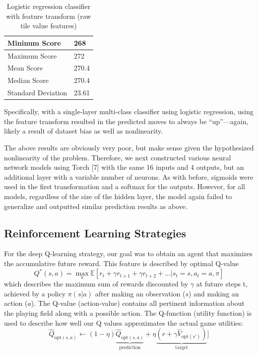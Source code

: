 \documentclass[9pt,twocolumn]{article}
\begin{document}
\begin{table}[!htbp]

\centering

\begin{tabular}{|l|l|}
\hline
Mininum Score      & 268 \\ \hline
Maximum Score      & 272 \\ \hline
Mean Score         & 270.4 \\ \hline
Median Score       & 270.4 \\ \hline
Standard Deviation & 23.61 \\ \hline
\end{tabular}

\caption{Logistic regression classifier with feature transform (raw tile value features)}

\end{table}

Specifically, with a single-layer multi-class classifier using logistic regression, using the feature transform resulted in the predicted moves to always be “up”---again, likely a result of dataset bias as well as nonlinearity.

The above results are obviously very poor, but make sense given the hypothesized nonlinearity of the problem. Therefore, we next constructed various neural network models using Torch [7] with the same 16 inputs and 4 outputs, but an additional layer with a variable number of neurons. As with before, sigmoids were used in the first transformation and a softmax for the outputs. However, for all models, regardless of the size of the hidden layer, the model again failed to generalize and outputted similar prediction results as above.

\subsection{Reinforcement Learning Strategies}

For the deep Q-learning strategy, our goal was to obtain an agent that maximizes the accumulative future reward. This feature is described by optimal Q-value $$Q^*(s, a) = \max_{\pi} \mathbb{E} [r_t + \gamma r_{t + 1} + \gamma r_{t + 2} + \dots | s_t = s, a_t = a, \pi]$$ which describes the maximum sum of rewards discounted by $\gamma$ at future steps t, achieved by a policy $\pi(s|a)$ after making an observation ($s$) and making an action ($a$). The Q-value (action-value) contains all pertinent information about the playing field along with a possible action. The Q-function (utility function) is used to describe how well our Q values approximates the actual game utilities: $$\hat Q_{\text{opt}(s, a)} \leftarrow (1-\eta) \underbrace{\hat Q_{\text{opt}(s, a)}}_\text{prediction} + \eta \underbrace{(r + \gamma \hat V_{\text{opt}(s')})}_\text{target}]$$
\end{document}
